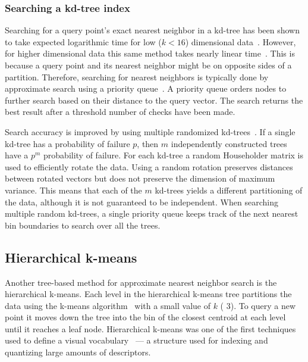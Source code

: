         \subsubsection{Searching a kd-tree index}
        Searching for a query point's exact nearest neighbor in a kd-tree has been shown to take expected
        logarithmic time for low ($k < 16$) dimensional data~\cite{friedman_algorithm_1977}. However, for higher
        dimensional data this same method takes nearly linear time~\cite{sproull_refinements_1991}. This is because
        a query point and its nearest neighbor might be on opposite sides of a partition. Therefore, searching for
        nearest neighbors is typically done by approximate search using a priority queue~\cite{beis_shape_1997}. A
        priority queue orders nodes to further search based on their distance to the query vector. The search
        returns the best result after a threshold number of checks have been made. %

        Search accuracy is improved by using multiple randomized kd-trees~\cite{silpa_anan_optimised_2008}. If a
        single kd-tree has a probability of failure $p$, then $m$ independently constructed trees have a $p^m$
        probability of failure. For each kd-tree a random Householder matrix is used to efficiently rotate the
        data. Using a random rotation preserves distances between rotated vectors but does not preserve the
        dimension of maximum variance. This means that each of the $m$ kd-trees yields a different partitioning of
        the data, although it is not guaranteed to be independent. When searching multiple random kd-trees, a
        single priority queue keeps track of the next nearest bin boundaries to search over all the trees.

    \subsection{Hierarchical k-means}
        Another tree-based method for approximate nearest neighbor search is the hierarchical k-means. Each level
        in the hierarchical k-means tree partitions the data using the k-means algorithm~\cite{lloyd_least_1982}
        with a small value of $k$ (\eg{} 3). To query a new point it moves down the tree into the bin of the
        closest centroid at each level until it reaches a leaf node. Hierarchical k-means was one of the first
        techniques used to define a visual vocabulary~\cite{nister_scalable_2006} --- a structure used for indexing
        and quantizing large amounts of descriptors.
    
